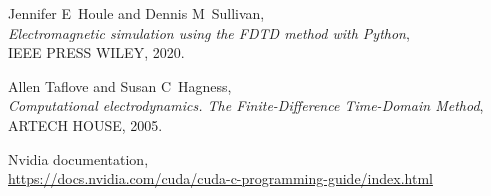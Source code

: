 \documentclass[11pt,a4paper,twoside,pdf]{article}
\numberwithin{equation}{section}
\begin{document}
\begin{thebibliography}{100}

  Jennifer E~Houle and Dennis M~Sullivan, \\
  {\em Electromagnetic simulation using the FDTD method with Python}, \\
  IEEE PRESS WILEY, 2020.
  
  Allen Taflove and Susan C~Hagness, \\
  {\em Computational electrodynamics. The Finite-Difference Time-Domain Method}, \\
  ARTECH HOUSE, 2005.

 Nvidia documentation, \\
 \href{https://docs.nvidia.com/cuda/cuda-c-programming-guide/index.html}{https://docs.nvidia.com/cuda/cuda-c-programming-guide/index.html}






 
\end{thebibliography}
\end{document}

